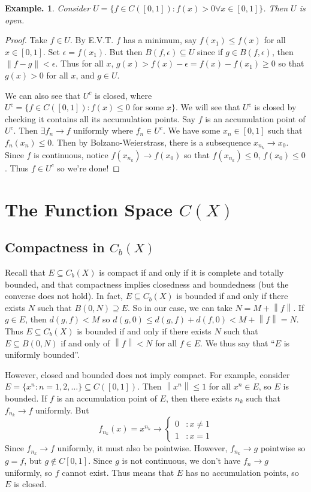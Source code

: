 \documentclass[11pt, a4paper]{memoir}
\newcommand{\norm}[1]{\ensuremath{\left\lVert#1\right\rVert}}
\theoremstyle{change}
\theoremstyle{plain}
\theoremstyle{nonumberplain}
\newtheorem{example}{Example.}
\newtheorem{proof}{Proof}
\numberwithin{equation}{section}
\begin{document}
\begin{example}
    Consider $U=\{f\in C([0,1]):f(x)>0\forall x\in[0,1]\}$. Then $U$ is open.
\end{example}
\begin{proof}
    Take $f\in U$.
    By E.V.T. $f$ has a minimum, say $f(x_1)\leq f(x)$ for all $x\in[0,1]$.
    Set $\epsilon=f(x_1)$.
    But then $B(f,\epsilon)\subseteq U$ since if $g\in B(f,\epsilon)$, then $\norm{f-g}<\epsilon$.
    Thus for all $x$, $g(x)>f(x)-\epsilon=f(x)-f(x_1)\geq 0$ so that $g(x)>0$ for all $x$, and $g\in U$.

    We can also see that $U^c$ is closed, where $U^c=\{f\in C([0,1]):\text{$f(x)\leq 0$ for some $x$}\}$.
    We will see that $U^c$ is closed by checking it contains all its accumulation points.
    Say $f$ is an accumulation point of $U^c$.
    Then $\exists f_n\to f$ uniformly where $f_n\in U^c$.
    We have some $x_n\in[0,1]$ such that $f_n(x_n)\leq 0$.
    Then by Bolzano-Weierstrass, there is a subsequence $x_{n_k}\to x_0$.
    Since $f$ is continuous, notice $f(x_{n_k})\to f(x_0)$ so that $f(x_{n_k})\leq 0$, $f(x_0)\leq 0$.
    Thus $f\in U^c$ so we're done!
\end{proof}
\chapter{The Function Space \texorpdfstring{$C(X)$}{C(X)}}
\section{Compactness in \texorpdfstring{$C_b(X)$}{Cb(X)}}
Recall that $E\subseteq C_b(X)$ is compact if and only if it is complete and totally bounded, and that compactness implies closedness and boundedness (but the converse does not hold).
In fact, $E\subseteq C_b(X)$ is bounded if and only if there exists $N$ such that $B(0,N)\supseteq E$.
So in our case, we can take $N=M+\norm{f}$.
If $g\in E$, then $d(g,f)<M$ so $d(g,0)\leq d(g,f)+d(f,0)<M+\norm{f}=N$.
Thus $E\subseteq C_b(X)$ is bounded if and only if there exists $N$ such that $E\subseteq B(0,N)$ if and only of $\norm{f}<N$ for all $f\in E$.
We thus say that ``$E$ is uniformly bounded''.

However, closed and bounded does not imply compact.
For example, consider $E=\{x^n:n=1,2,\ldots\}\subseteq C([0,1])$.
Then $\norm{x^n}\leq 1$ for all $x^n\in E$, so $E$ is bounded.
If $f$ is an accumulation point of $E$, then there exists $n_k$ such that $f_{n_k}\to f$ uniformly.
But
\[f_{n_k}(x)=x^{n_k}\to
    \begin{cases}
        0 &:x\neq 1\\
        1 &:x = 1
    \end{cases}
\]
Since $f_{n_k}\to f$ uniformly, it must also be pointwise.
However, $f_{n_k}\to g$ pointwise so $g=f$, but $g\notin C[0,1]$.
Since $g$ is not continuous, we don't have $f_n\to g$ uniformly, so $f$ cannot exist.
Thus means that $E$ has no accumulation points, so $E$ is closed.
\end{document}
